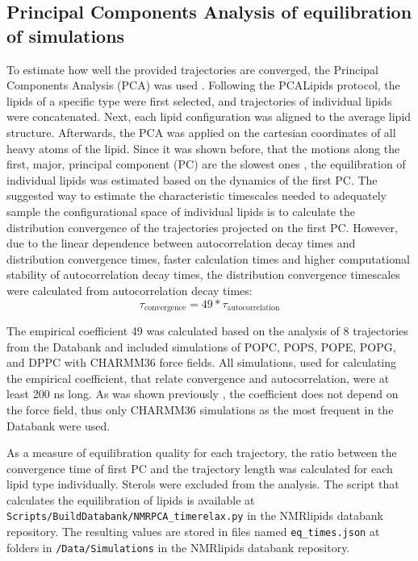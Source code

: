 \documentclass[fleqn,10pt]{wlscirep}
\begin{document}
\subsection{Principal Components Analysis of equilibration of simulations}
To estimate how well the provided trajectories are converged, the Principal Components Analysis (PCA) was used \cite{buslaev16,buslaev2020principal}. Following the PCALipids \cite{buslaev2020principal} protocol, the lipids of a specific type were first selected, and trajectories of individual lipids were concatenated. Next, each lipid configuration was aligned to the average lipid structure. Afterwards, the PCA was applied on the cartesian coordinates of all heavy atoms of the lipid. Since it was shown before, that the motions along the first, major, principal component (PC) are the slowest ones \cite{buslaev16}, the equilibration of individual lipids was estimated based on the dynamics of the first PC. The suggested way to estimate the characteristic timescales needed to adequately sample the configurational space of individual lipids is to calculate the distribution convergence of the trajectories projected on the first PC\cite{buslaev16}. However, due to the linear dependence between autocorrelation decay times and distribution convergence times, faster calculation times and higher computational stability of autocorrelation decay times\cite{buslaev16, buslaev2020principal}, the distribution convergence timescales were calculated from autocorrelation decay times:
\begin{equation}
    \tau_{\text{convergence}} = 49*\tau_{\text{autocorrelation}}
\end{equation}

The empirical coefficient 49 was calculated based on the analysis of 8 trajectories from the Databank and included simulations of POPC, POPS, POPE, POPG, and DPPC with CHARMM36 force fields. All simulations, used for calculating the empirical coefficient, that relate convergence and autocorrelation, were at least 200 ns long. As was shown previously \cite{buslaev16}, the coefficient does not depend on the force field, thus only CHARMM36 simulations as the most frequent in the Databank were used. 

As a measure of equilibration quality for each trajectory, the ratio between the convergence time of first PC and the trajectory length was calculated for each lipid type individually. Sterols were excluded from the analysis. The script that calculates the equilibration of lipids is available at \texttt{Scripts/BuildDatabank/NMRPCA\_timerelax.py} in the NMRlipids databank repository. The resulting values are stored in files named \texttt{eq\_times.json} at folders in \texttt{/Data/Simulations} in the NMRlipids databank repository. 
\end{document}
